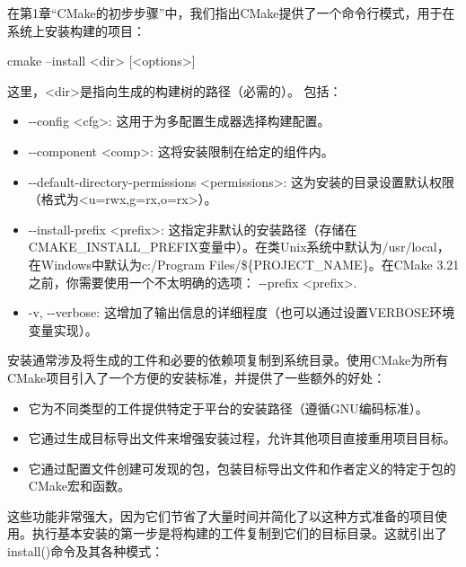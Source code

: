 
在第1章“CMake的初步步骤”中，我们指出CMake提供了一个命令行模式，用于在系统上安装构建的项目：

\begin{shell}
cmake --install <dir> [<options>]
\end{shell}

这里，<dir>是指向生成的构建树的路径（必需的）。 包括：

\begin{itemize}
\item
-{}-config <cfg>: 这用于为多配置生成器选择构建配置。

\item
-{}-component <comp>: 这将安装限制在给定的组件内。

\item
-{}-default-directory-permissions <permissions>: 这为安装的目录设置默认权限（格式为<u=rwx,g=rx,o=rx>）。

\item
-{}-install-prefix <prefix>: 这指定非默认的安装路径（存储在CMAKE\_INSTALL\_PREFIX变量中）。在类Unix系统中默认为/usr/local，在Windows中默认为c:/Program Files/\$\{PROJECT\_NAME\}。在CMake 3.21之前，你需要使用一个不太明确的选项： -{}-prefix <prefix>.

\item
-v, -{}-verbose: 这增加了输出信息的详细程度（也可以通过设置VERBOSE环境变量实现）。
\end{itemize}

安装通常涉及将生成的工件和必要的依赖项复制到系统目录。使用CMake为所有CMake项目引入了一个方便的安装标准，并提供了一些额外的好处：

\begin{itemize}
\item
它为不同类型的工件提供特定于平台的安装路径（遵循GNU编码标准）。

\item
它通过生成目标导出文件来增强安装过程，允许其他项目直接重用项目目标。

\item
它通过配置文件创建可发现的包，包装目标导出文件和作者定义的特定于包的CMake宏和函数。
\end{itemize}

这些功能非常强大，因为它们节省了大量时间并简化了以这种方式准备的项目使用。执行基本安装的第一步是将构建的工件复制到它们的目标目录。这就引出了install()命令及其各种模式：

